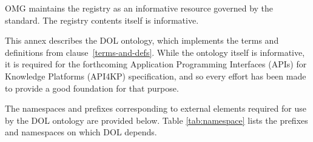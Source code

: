 \documentclass[10pt, a4paper]{isov2}
\newcommand*{\DOL}{\ensuremath{\mathsf{DOL}}\xspace}
\begin{document}
OMG maintains the registry as an informative resource governed by the standard. The registry 
 contents itself is informative. 






\cleardoublepage
\infannex{\DOL Ontology}
\label{a:dol-onto}

This annex describes the DOL ontology, which implements the terms and definitions from
clause~\ref{terms-and-defs}. While the ontology itself is informative, it is required for the 
forthcoming Application Programming Interfaces (APIs) for Knowledge Platforms (API4KP) 
specification, and so every effort has been made to provide a good foundation for that purpose.  

The namespaces and prefixes corresponding to external elements required for use by the DOL ontology
are provided below.  Table \ref{tab:namespace} lists the prefixes and namespaces on which DOL depends.
\end{document}
